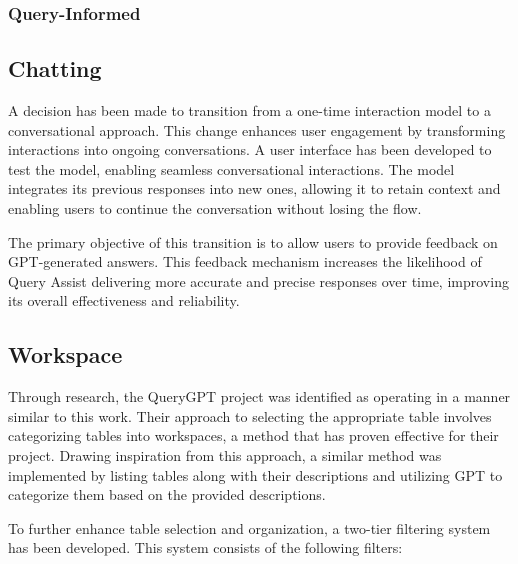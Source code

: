         \subsubsection{Query-Informed}
    \subsection{Chatting}
    A decision has been made to transition from a one-time interaction model to a conversational approach. This change enhances user engagement by transforming interactions into ongoing conversations. A user interface has been developed to test the model, enabling seamless conversational interactions. The model integrates its previous responses into new ones, allowing it to retain context and enabling users to continue the conversation without losing the flow.

    The primary objective of this transition is to allow users to provide feedback on GPT-generated answers. This feedback mechanism increases the likelihood of Query Assist delivering more accurate and precise responses over time, improving its overall effectiveness and reliability.
    \subsection{Workspace}
    Through research, the QueryGPT project \cite{QueryGPT} was identified as operating in a manner similar to this work. Their approach to selecting the appropriate table involves categorizing tables into workspaces, a method that has proven effective for their project. Drawing inspiration from this approach, a similar method was implemented by listing tables along with their descriptions and utilizing GPT to categorize them based on the provided descriptions.

    To further enhance table selection and organization, a two-tier filtering system has been developed. This system consists of the following filters:

